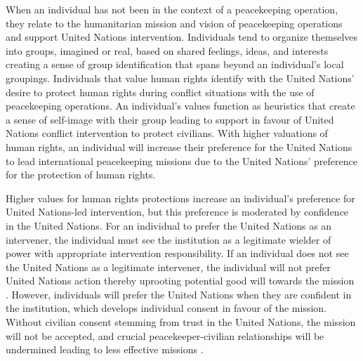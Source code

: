 \documentclass[12pt]{article}
\newcommand{\UN}[1]{United Nations}
\newcommand{\PKO}[1]{peacekeeping operation}
\newcommand{\PKOs}[1]{peacekeeping operations}
\begin{document}

When an individual has not been in the context of a \PKO{}, they relate to the humanitarian mission and vision of \PKOs{} and support \UN{} intervention. Individuals tend to organize themselves into groups, imagined \citep[Ex.][]{anderson2006imagined} or real, based on shared feelings, ideas, and interests creating a sense of group identification \citep{koch1994group} that spans beyond an individual's local groupings. Individuals that value human rights identify with the \UN{}’ desire to protect human rights during conflict situations with the use of \PKOs{}. An individual's values function as heuristics that create a sense of self-image with their group \citep{conover1984influence} leading to support in favour of \UN{} conflict intervention to protect civilians. With higher valuations of human rights, an individual will increase their preference for the \UN{} to lead international peacekeeping missions due to the \UN{}’ preference for the protection of human rights.  

Higher values for human rights protections increase an individual's preference for \UN{}-led intervention, but this preference is moderated by confidence in the \UN{}. For an individual to prefer the \UN{} as an intervener, the individual must see the institution as a legitimate wielder of power with appropriate intervention responsibility. If an individual does not see the \UN{} as a legitimate intervener, the individual will not prefer \UN{} action thereby uprooting potential good will towards the mission \citep{newby2018power}. However, individuals will prefer the \UN{} when they are confident in the institution, which develops individual consent in favour of the mission. Without civilian consent stemming from trust in the \UN{}, the mission will not be accepted, and crucial peacekeeper-civilian relationships will be undermined leading to less effective missions \citep{whalan2013peace}. 
\end{document}
